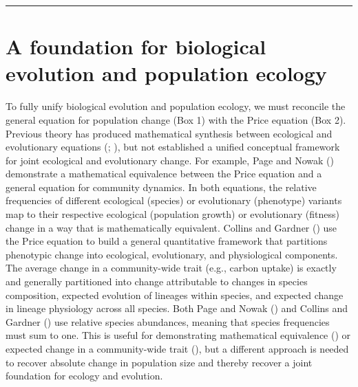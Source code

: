 \documentclass[
]{article}
\begin{document}
\begin{center}\rule{0.5\linewidth}{0.5pt}\end{center}

\section{A foundation for biological evolution and population
ecology}\label{a-foundation-for-biological-evolution-and-population-ecology}

To fully unify biological evolution and population ecology, we must
reconcile the general equation for population change (Box 1) with the
Price equation (Box 2). Previous theory has produced mathematical
synthesis between ecological and evolutionary equations
(;
), but not
established a unified conceptual framework for joint ecological and
evolutionary change. For example, Page and Nowak
() demonstrate a mathematical equivalence
between the Price equation and a general equation for community
dynamics. In both equations, the relative frequencies of different
ecological (species) or evolutionary (phenotype) variants map to their
respective ecological (population growth) or evolutionary (fitness)
change in a way that is mathematically equivalent. Collins and Gardner
() use the Price equation to build a
general quantitative framework that partitions phenotypic change into
ecological, evolutionary, and physiological components. The average
change in a community-wide trait (e.g., carbon uptake) is exactly and
generally partitioned into change attributable to changes in species
composition, expected evolution of lineages within species, and expected
change in lineage physiology across all species. Both Page and Nowak
() and Collins and Gardner
() use relative species abundances,
meaning that species frequencies must sum to one. This is useful for
demonstrating mathematical equivalence () or expected change in a community-wide trait
(), but a different
approach is needed to recover absolute change in population size and
thereby recover a joint foundation for ecology and evolution.
\end{document}
